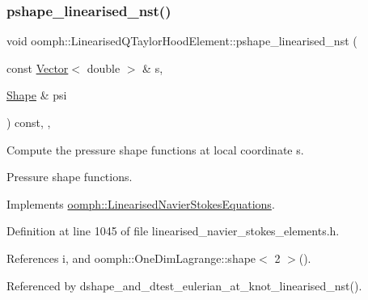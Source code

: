 \subsubsection{\texorpdfstring{pshape\+\_\+linearised\+\_\+nst()}{pshape\_linearised\_nst()}\hspace{0.1cm}{\footnotesize\ttfamily [1/2]}}
{\footnotesize\ttfamily void oomph\+::\+Linearised\+Q\+Taylor\+Hood\+Element\+::pshape\+\_\+linearised\+\_\+nst (\begin{DoxyParamCaption}\item[{const \hyperlink{classoomph_1_1Vector}{Vector}$<$ double $>$ \&}]{s,  }\item[{\hyperlink{classoomph_1_1Shape}{Shape} \&}]{psi }\end{DoxyParamCaption}) const\hspace{0.3cm}{\ttfamily [inline]}, {\ttfamily [protected]}, {\ttfamily [virtual]}}



Compute the pressure shape functions at local coordinate s. 

Pressure shape functions. 

Implements \hyperlink{classoomph_1_1LinearisedNavierStokesEquations_a6158d0cdb646491170e4b75abfc88538}{oomph\+::\+Linearised\+Navier\+Stokes\+Equations}.



Definition at line 1045 of file linearised\+\_\+navier\+\_\+stokes\+\_\+elements.\+h.



References i, and oomph\+::\+One\+Dim\+Lagrange\+::shape$<$ 2 $>$().



Referenced by dshape\+\_\+and\+\_\+dtest\+\_\+eulerian\+\_\+at\+\_\+knot\+\_\+linearised\+\_\+nst().

\mbox{\label{classoomph_1_1LinearisedQTaylorHoodElement_a468b7ce0892709fada4b19acf74646e7}} 
